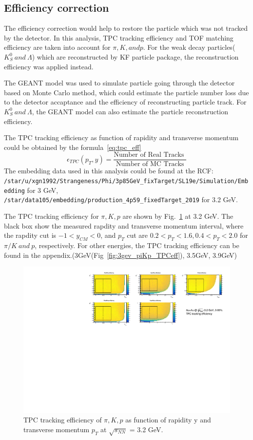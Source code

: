 \subsection{Efficiency correction}


The efficiency correction would help to restore the particle which was not tracked by the detector.
In this analysis, TPC tracking efficiency and TOF matching efficiency are taken into account for $\pi, K, and p.$
For the weak decay particles($K^{0}_{S}~and~\Lambda$) which are reconstructed by KF particle package, 
the reconstruction efficiency was applied instead. 

The GEANT model\cite{AGOSTINELLI2003250} was used to simulate particle going through the detector based on Monte Carlo method, 
which could estimate the particle number loss due to the detector accaptance and the efficiency of reconstructing particle track.
For $K^0_S~and~\Lambda$, the GEANT model can also estimate the particle reconstruction efficiency.

The TPC tracking efficiency as function of rapidity and transverse momentum could be obtained by the formula~\ref{eq:tpc_eff}
\begin{equation}
    \epsilon_{TPC}\left(p_T, y\right)=\frac{\text {Number of Real Tracks }}{\text { Number of MC Tracks }}
\label{eq:tpc_eff}
\end{equation}
The embedding data used in this analysis could be found at the RCF: \\
\verb|/star/u/xgn1992/Strangeness/Phi/3p85GeV_fixTarget/SL19e/Simulation/Embedding| for 3 GeV,
\verb|/star/data105/embedding/production_4p59_fixedTarget_2019| for 3.2 GeV.

The TPC tracking efficiency for $\pi, K, p$ are shown by Fig.~\ref{fig:3p2_piKp_TPCeff} at 3.2 GeV. 
The black box show the measured rapdity and transverse momentum interval, where the rapdity cut is $-1<y_{CM}<0$, 
and $p_T$ cut are $0.2<p_T<1.6, 0.4<p_T<2.0$ for $\pi/K ~and~ p$, respectively. 
For other energies, the TPC tracking efficiency can be found in the appendix.(3GeV(Fig~\ref{fig:3gev_piKp_TPCeff}), 3.5GeV, 3.9GeV)

\begin{figure}[hbt!]
\centering
\includegraphics[width=0.65\linewidth]{figures/chapter02/3p2gev_TPC_eff.pdf}
\caption{TPC tracking efficiency of $\pi, K, p$ as function of rapidity y and transverse momentum $p_T$ at $\sqrt{s_{NN}}$ = 3.2 GeV.}
\label{fig:3p2_piKp_TPCeff}
\end{figure}

